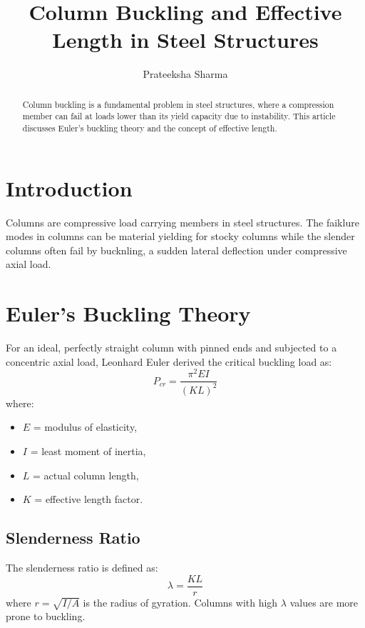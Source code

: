 \documentclass[12pt,a4paper]{article}
\title{\textbf{Column Buckling and Effective Length in Steel Structures}}
\author{Prateeksha Sharma}
\date{}
\begin{document}
\maketitle

\begin{abstract}
Column buckling is a fundamental problem in steel structures, where a compression member can fail at loads lower than its yield capacity due to instability. This article discusses Euler's buckling theory and the concept of effective length.
\end{abstract}

\section{Introduction}
Columns are compressive load carrying members in steel structures. The faiklure modes in columns can be material yielding for stocky columns while the slender columns often fail by bucknling, a sudden lateral deflection under compressive axial load.

\section{Euler's Buckling Theory}
For an ideal, perfectly straight column with pinned ends and subjected to a concentric axial load, Leonhard Euler derived the critical buckling load as:
\begin{equation}
    P_{cr} = \frac{\pi^2 E I}{(K L)^2}
\end{equation}
where:
\begin{itemize}
    \item $E$ = modulus of elasticity,
    \item $I$ = least moment of inertia,
    \item $L$ = actual column length,
    \item $K$ = effective length factor.
\end{itemize}

\subsection{Slenderness Ratio}
The slenderness ratio is defined as:
\begin{equation}
    \lambda = \frac{K L}{r}
\end{equation}
where $r = \sqrt{I/A}$ is the radius of gyration. Columns with high $\lambda$ values are more prone to buckling.
\end{document}
